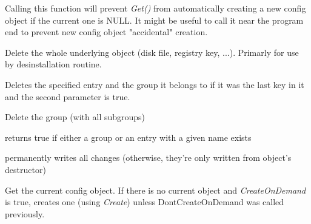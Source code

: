\label{wxconfigbasedontcreateondemand}


Calling this function will prevent {\it Get()} from automatically creating a
new config object if the current one is NULL. It might be useful to call it
near the program end to prevent new config object "accidental" creation.


\label{wxconfigbasedeleteall}


Delete the whole underlying object (disk file, registry key, ...). Primarly
for use by desinstallation routine.


\label{wxconfigbasedeleteentry}


Deletes the specified entry and the group it belongs to if it was the last key
in it and the second parameter is true.


\label{wxconfigbasedeletegroup}


Delete the group (with all subgroups)


\label{wxconfigbaseexists}


returns true if either a group or an entry with a given name exists


\label{wxconfigbaseflush}


permanently writes all changes (otherwise, they're only written from object's
destructor)


\label{wxconfigbaseget}


Get the current config object. If there is no current object and
{\it CreateOnDemand} is true, creates one
(using {\it Create}) unless DontCreateOnDemand was called previously.


\label{wxconfigbasegetappname}

